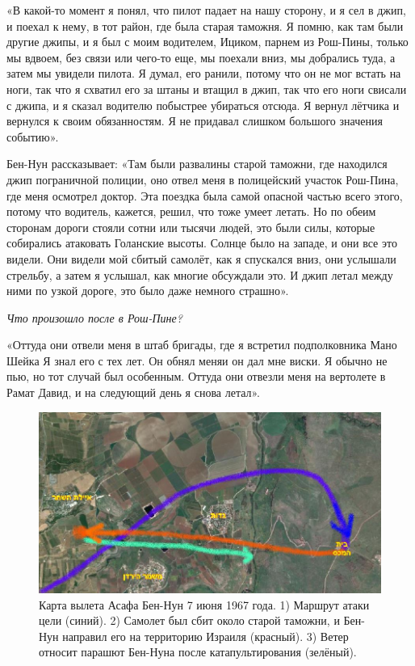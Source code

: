 «В какой-то момент я понял, что пилот падает на нашу сторону, и я сел в джип, и поехал к нему, в тот район, где была старая таможня. Я помню, как там были другие джипы, и я был с моим водителем, Ициком, парнем из Рош-Пины, только мы вдвоем, без связи или чего-то еще, мы поехали вниз, мы добрались туда, а затем мы увидели пилота. Я думал, его ранили, потому что он не мог встать на ноги, так что я схватил его за штаны и втащил в джип, так что его ноги свисали с джипа, и я сказал водителю побыстрее убираться отсюда. Я вернул лётчика и вернулся к своим обязанностям. Я не придавал слишком большого значения событию».

Бен-Нун рассказывает: «Там были развалины старой таможни, где находился джип пограничной полиции, оно отвел меня в полицейский участок Рош-Пина, где меня осмотрел доктор. Эта поездка была самой опасной частью всего этого, потому что водитель, кажется, решил, что тоже умеет летать. Но по обеим сторонам дороги стояли сотни или тысячи людей, это были силы, которые собирались атаковать Голанские высоты. Солнце было на западе, и они все это видели. Они видели мой сбитый самолёт, как я спускался вниз, они услышали стрельбу, а затем я услышал, как многие обсуждали это. И джип летал между ними по узкой дороге, это было даже немного страшно». 

\textit{Что произошло после в Рош-Пине? }

«Оттуда они отвели меня в штаб бригады, где я встретил подполковника Мано Шейка Я знал его с тех лет. Он обнял меняи он дал мне виски. Я обычно не пью, но тот случай был особенным. Оттуда они отвезли меня на вертолете в Рамат Давид, и на следующий день я снова летал».

\begin{figure}[h!tb] 
	\centering\includegraphics[scale=0.6]{History_BenNun/1O9jR38jRwA.jpg}
	\caption{Карта вылета Асафа Бен-Нун 7 июня 1967 года. 1) Маршрут атаки цели (синий). 2) Самолет был сбит около старой таможни, и Бен-Нун направил его на территорию Израиля (красный). 3) Ветер относит парашют Бен-Нуна после катапультирования (зелёный). }%
\end{figure}

